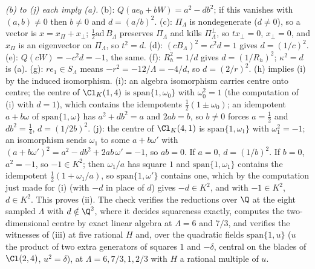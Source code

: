 \emph{(b) to (j) each imply (a).} (b): $Q(ae_{0} + bW) = a^{2} - db^{2}$; if this vanishes with $(a, b) \neq 0$ then $b \neq 0$ and $d = (a/b)^{2}$. (c): $\Pi_{\Lambda}$ is nondegenerate ($d \neq 0$), so a vector is $x = x_{\Pi} + x_{\perp}$; $\tfrac12\mathrm{ad}\,B_{\Lambda}$ preserves $\Pi_{\Lambda}$ and kills $\Pi_{\Lambda}^{\perp}$, so $tx_{\perp} = 0$, $x_{\perp} = 0$, and $x_{\Pi}$ is an eigenvector on $\Pi_{\Lambda}$, so $t^{2} = d$. (d): $(cB_{\Lambda})^{2} = c^{2}d = 1$ gives $d = (1/c)^{2}$. (e): $Q(cW) = -c^{2}d = -1$, the same. (f): $R_{h}^{2} = 1/d$ gives $d = (1/R_{h})^{2}$; $\kappa^{2} = d$ is (a). (g): $re_{1} \in S_{\Lambda}$ means $-r^{2} = -12/\Lambda = -4/d$, so $d = (2/r)^{2}$. (h) implies (i) by the induced isomorphism. (i): an algebra isomorphism carries centre onto centre; the centre of $\Cl_{K}(1,4)$ is $\mathrm{span}\{1, \omega_{0}\}$ with $\omega_{0}^{2} = 1$ (the computation of (i) with $d = 1$), which contains the idempotents $\tfrac12(1 \pm \omega_{0})$; an idempotent $a + b\omega$ of $\mathrm{span}\{1, \omega\}$ has $a^{2} + db^{2} = a$ and $2ab = b$, so $b \neq 0$ forces $a = \tfrac12$ and $db^{2} = \tfrac14$, $d = (1/2b)^{2}$. (j): the centre of $\Cl_{K}(4,1)$ is $\mathrm{span}\{1, \omega_{1}\}$ with $\omega_{1}^{2} = -1$; an isomorphism sends $\omega_{1}$ to some $a + b\omega'$ with $(a + b\omega')^{2} = a^{2} - db^{2} + 2ab\,\omega' = -1$, so $ab = 0$. If $a = 0$, $d = (1/b)^{2}$. If $b = 0$, $a^{2} = -1$, so $-1 \in K^{2}$; then $\omega_{1}/a$ has square $1$ and $\mathrm{span}\{1, \omega_{1}\}$ contains the idempotent $\tfrac12(1 + \omega_{1}/a)$, so $\mathrm{span}\{1, \omega'\}$ contains one, which by the computation just made for (i) (with $-d$ in place of $d$) gives $-d \in K^{2}$, and with $-1 \in K^{2}$, $d \in K^{2}$. This proves (ii). The check verifies the reductions over $\Q$ at the eight sampled $\Lambda$ with $d \notin \Q^{2}$, where it decides squareness exactly, computes the two-dimensional centre by exact linear algebra at $\Lambda = 6$ and $7/3$, and verifies the witnesses of (iii) at five rational $H$ and, over the quadratic fields $\mathrm{span}\{1, u\}$ ($u$ the product of two extra generators of squares $1$ and $-\delta$, central on the blades of $\Cl(2,4)$, $u^{2} = \delta$), at $\Lambda = 6, 7/3, 1, 2/3$ with $H$ a rational multiple of $u$.

